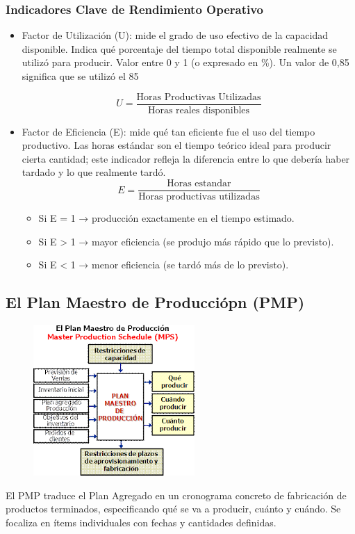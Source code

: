 \documentclass[a4paper,oneside,11pt]{article}
\begin{document}
\subsubsection{Indicadores Clave de Rendimiento Operativo}
\begin{itemize}
    \item Factor de Utilización (U): mide el grado de uso efectivo de la capacidad disponible. Indica qué porcentaje del tiempo total disponible realmente se utilizó para producir. Valor entre 0 y 1 (o expresado en \%). Un valor de 0,85 significa que se utilizó el 85%

    \begin{equation*}
        U = \dfrac{\text{Horas Productivas Utilizadas}}{\text{Horas reales disponibles}}
    \end{equation*}

    \item Factor de Eficiencia (E): mide qué tan eficiente fue el uso del tiempo productivo. Las horas estándar son el tiempo teórico ideal para producir cierta cantidad; este indicador refleja la diferencia entre lo que debería haber tardado y lo que realmente tardó. 
    \begin{equation*}
        E = \dfrac{\text{Horas estandar}}{\text{Horas productivas utilizadas}}
    \end{equation*}
    \begin{itemize}
        \item Si E = 1 → producción exactamente en el tiempo estimado.
        \item Si E > 1 → mayor eficiencia (se produjo más rápido que lo previsto).
        \item Si E < 1 → menor eficiencia (se tardó más de lo previsto).
    \end{itemize}
\end{itemize}

\subsection{El Plan Maestro de Producciópn (PMP)}
\begin{figure} [ht!]
    \centering
    \includegraphics[scale=0.8]{pmpcuadrooo.png}
\end{figure}
El PMP traduce el Plan Agregado en un cronograma concreto de fabricación de productos terminados, especificando qué se va a producir, cuánto y cuándo. Se focaliza en ítems individuales con fechas y cantidades definidas.
\end{document}
